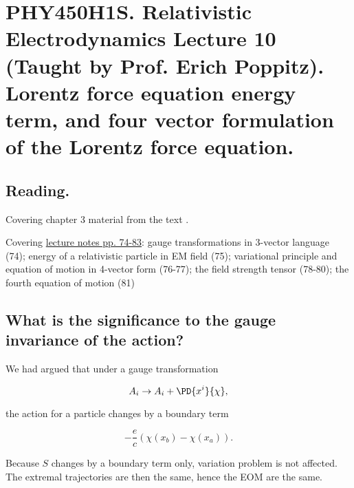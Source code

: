 
%

\chapter{PHY450H1S.  Relativistic Electrodynamics Lecture 10 (Taught by Prof. Erich Poppitz).  Lorentz force equation energy term, and four vector formulation of the Lorentz force equation.}
\label{chap:relativisticElectrodynamicsL10}
{}
\date{Feb 8, 2011}

\beginArtNoToc

\section{Reading.}

Covering chapter 3 material from the text \cite{landau1980classical}.

Covering \href{http://www.physics.utoronto.ca/~poppitz/e-poppitz/PHY450_files/RelEMpp74-83.pdf}{lecture notes pp. 74-83}: gauge transformations in 3-vector language (74); energy of a relativistic particle in EM field (75); variational principle and equation of motion in 4-vector form (76-77); the field strength tensor (78-80); the fourth equation of motion (81)

\section{What is the significance to the gauge invariance of the action?}

We had argued that under a gauge transformation

\begin{equation}\label{eqn:relativisticElectrodynamicsL10:n}
A_i \rightarrow A_i + \PD{x^i}{\chi},
\end{equation}

the action for a particle changes by a boundary term 

\begin{equation}\label{eqn:relativisticElectrodynamicsL10:n}
- \frac{e}{c} ( \chi(x_b) - \chi(x_a) ).
\end{equation}

Because $S$ changes by a boundary term only, variation problem is not affected.  The extremal trajectories are then the same, hence the EOM are the same.


